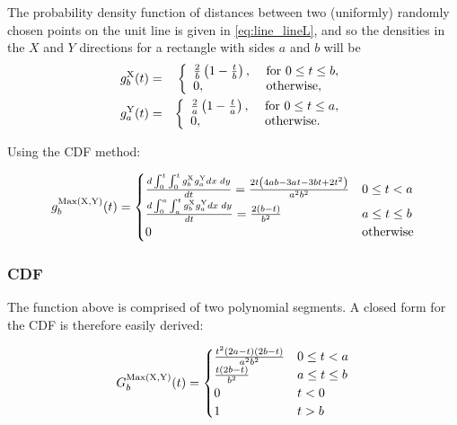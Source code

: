 The probability density function of distances between two (uniformly) 
randomly chosen points on the unit line is given in
\eqref{eq:line_lineL}, and so the densities in the $X$ and $Y$
directions for a rectangle with sides $a$ and $b$ will be 
\begin{eqnarray}
  \label{eq:rect_xy}
  g^{\rm X}_b(t) & = & \left\{ \begin{array}{ll}
                    \frac{2}{b} \left( 1-\frac{t}{b} \right), &
                         \mbox{ for } 0 \leq t \leq b, \\
                    0, & \mbox{ otherwise}, \\
                  \end{array} \right. \nonumber \\
  g^{\rm Y}_a(t) & = & \left\{ \begin{array}{ll}
                    \frac{2}{a} \left( 1-\frac{t}{a} \right), &
                         \mbox{ for } 0 \leq t \leq a, \\
                    0, & \mbox{ otherwise}. \\
                  \end{array} \right. \nonumber 
\end{eqnarray}

Using the CDF method: 

\begin{equation}
 g^{\rm Max( X, Y)}_b(t) =
 \begin{cases}
 \frac {d  \int_{0}^{t} \int_{0}^{t}  g^{\rm X}_b g^{\rm Y}_a  dx\; dy }{dt} = \frac{2 t \left(4 a b-3 a t-3 b t+2 t^2\right)}{a^2 b^2} & 0 \le t < a \\ 
 \frac {d  \int_{0}^{a} \int_{a}^{t}  g^{\rm X}_b g^{\rm Y}_a  dx\; dy }{dt} = \frac{2 (b-t)}{b^2}& a \le t  \le b \\ 
 0 & \mbox{otherwise}
 \end{cases}
\end{equation}




\subsubsection{CDF}

The function above is comprised of two polynomial segments. A
closed form for the CDF is therefore easily derived:

\begin{equation}
 G^{\rm Max( X, Y)}_b(t) =
 \begin{cases}
 \frac{t^2 (2 a-t) (2 b-t)}{a^2 b^2} & 0 \le t < a \\ 
 \frac{t (2 b-t)}{b^2} & a \le t  \le b \\ 
 0 & t < 0\\
 1 & t > b
 \end{cases}
\end{equation}





